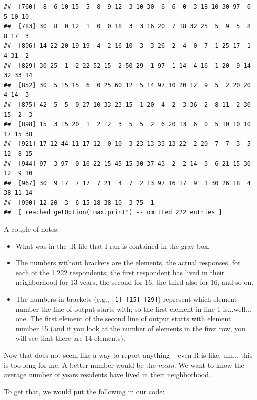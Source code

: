 \documentclass[]{article}
\newenvironment{Shaded}{\begin{snugshade}}{\end{snugshade}}
\newcommand{\KeywordTok}[1]{\textcolor[rgb]{0.13,0.29,0.53}{\textbf{{#1}}}}
\newcommand{\NormalTok}[1]{{#1}}
\begin{document}
\begin{verbatim}
##  [760]  8  6 10 15  5  8  9 12  3 10 30  6  6  0  3 18 10 30 97  0  5 10 10
##  [783] 30  8  0 12  1  0  0 18  3  3 16 20  7 18 32 25  5  9  5  8  8 17  3
##  [806] 14 22 20 19 19  4  2 16 10  3  3 26  2  4  0  7  1 25 17  1  4 31  2
##  [829] 30 25  1  2 22 52 15  2 50 29  1 97  1 14  4 16  1 20  9 14 32 33 14
##  [852] 30  5 15 15  6  0 25 60 12  5 14 97 10 20 12  9  5  2 20 20  4 14  3
##  [875] 42  5  5  0 27 10 33 23 15  1 20  4  2  3 36  2  8 11  2 30 15  2  3
##  [898] 15  3 15 20  1  2 12  3  5  5  2  6 20 13  6  0  5 10 10 10 17 15 38
##  [921] 17 12 44 11 17 12  0 10  3 23 13 33 13 22  2 20  7  7  3  5 12  8 15
##  [944] 97  3 97  0 16 22 15 45 15 30 37 43  2  2 14  3  6 21 15 30 12  9 10
##  [967] 30  9 17  7 17  7 21  4  7  2 13 97 16 17  9  1 30 26 18  4 38 11 14
##  [990] 12 20  3  6 15 18 38 10  3 75  1
##  [ reached getOption("max.print") -- omitted 222 entries ]
\end{verbatim}

A couple of notes:

\begin{itemize}
\item
  What was in the .R file that I ran is contained in the gray box.
\item
  The numbers without brackets are the elements, the actual responses,
  for each of the 1,222 respondents; the first respondent has lived in
  their neighborhood for 13 years, the second for 16, the third also for
  16, and so on.
\item
  The numbers in brackets (e.g., {\texttt{{[}1{]}\ {[}15{]}\ {[}29{]}}})
  represent which element number the line of output starts with; so the
  first element in line 1 is\(\ldots\)well\(\ldots\)one. The first
  element of the second line of output starts with element number 15
  (and if you look at the number of elements in the first row, you will
  see that there are 14 elements).
\end{itemize}

Now that does not seem like a way to report anything -- even R is like,
um\(\ldots\) this is too long for me. A better number would be the
\emph{mean}. We want to know the average number of years residents have
lived in their neighborhood.

To get that, we would put the following in our code:

\begin{Shaded}
\end{Shaded}
\end{document}
